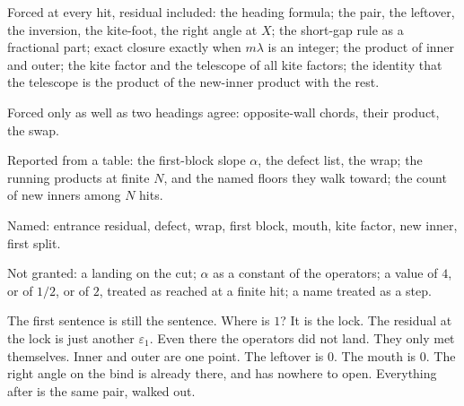 \documentclass[10pt,a4paper]{article}
\theoremstyle{plain}
\theoremstyle{definition}
\theoremstyle{remark}
\begin{document}
Forced at every hit, residual included:
the heading formula;
the pair, the leftover, the inversion, the kite-foot, the right angle at \(X\);
the short-gap rule as a fractional part;
exact closure exactly when \(m\lambda\) is an integer;
the product of inner and outer;
the kite factor and the telescope of all kite factors;
the identity that the telescope is the product of the new-inner product with the rest.

Forced only as well as two headings agree:
opposite-wall chords, their product, the swap.

Reported from a table:
the first-block slope \(\alpha\), the defect list, the wrap;
the running products at finite \(N\), and the named floors they walk toward;
the count of new inners among \(N\) hits.

Named: entrance residual, defect, wrap, first block, mouth, kite factor, new inner, first split.

Not granted:
a landing on the cut;
\(\alpha\) as a constant of the operators;
a value of \(4\), or of \(1/2\), or of \(2\), treated as reached at a finite hit;
a name treated as a step.

The first sentence is still the sentence.
Where is \(1\)?
It is the lock.
The residual at the lock is just another \(\varepsilon_1\).
Even there the operators did not land.
They only met themselves.
Inner and outer are one point.
The leftover is \(0\).
The mouth is \(0\).
The right angle on the bind is already there, and has nowhere to open.
Everything after is the same pair, walked out.
\end{document}
